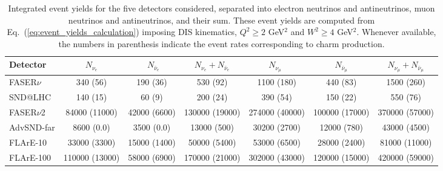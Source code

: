 \begin{table}[t]
  \centering
  \small
  \renewcommand{\arraystretch}{1.70}
\begin{tabularx}{\textwidth}{X|c|c|c|c|c|c}
\toprule
Detector & $\quad$ $N_{\nu_e}$ $\quad$ &$\quad$ $N_{\bar{\nu}_e}$$\quad$   &   $N_{\nu_e} + N_{\bar{\nu}_e}$ &
$\quad$$N_{\nu_\mu}$ $\quad$ & $\quad$ $N_{\bar{\nu}_\mu}$ $\quad$  &   $N_{\nu_\mu} + N_{\bar{\nu}_\mu}$ \\
\midrule
\midrule
FASER$\nu$  & 340 (56)    & 190 (36)  & 530 (92)  &  1100 (180)  &  440 (83)  &  1500 (260) \\
SND@LHC  &  140 (15)  & 60 (9)    & 200 (24)   &  390 (54) & 150 (22)   &  550  (76)\\
\midrule
\midrule
FASER$\nu$2  & 84000 (11000)   & 42000 (6600)   & 130000 (19000)  & 274000 (40000)  & 100000 (17000)    & 370000 (57000)   \\
AdvSND-far  &  8600 (0.0)  & 3500 (0.0)   & 13000 (500)  & 30200 (2700)  & 12000 (780)   & 43000 (4500)   \\
FLArE-10 & 33000 (3300) & 15000 (1400)   &  50000 (5400) &  53000 (6500)&   28000 (2400) &   81000 (11000) \\
FLArE-100 &   110000 (13000)         &    58000 (6900)         &       170000 (21000)       &   302000 (43000)           &  120000 (15000)    &  420000 (59000)  \\
  \bottomrule
\end{tabularx}
\vspace{0.2cm}
\caption{\small Integrated event yields for the five detectors considered,
  separated into electron neutrinos and antineutrinos,
  muon neutrinos and antineutrinos, and their sum.
  These event yields are computed from Eq.~(\ref{eq:event_yields_calculation})
  imposing DIS kinematics, $Q^2 \ge 2$ GeV$^2$ and $W^2 \ge 4$ GeV$^2$.
  Whenever available, the
  numbers in parenthesis indicate the event rates corresponding to charm
  production.
  \label{tab:integrated_rates}
}
\end{table}

